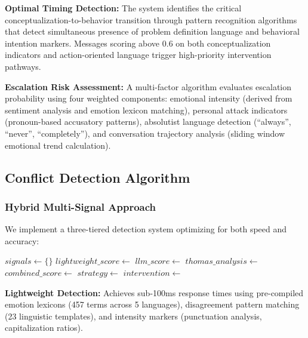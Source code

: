\documentclass[12pt,a4paper]{article}
\begin{document}
\textbf{Optimal Timing Detection:} The system identifies the critical conceptualization-to-behavior transition through pattern recognition algorithms that detect simultaneous presence of problem definition language and behavioral intention markers. Messages scoring above 0.6 on both conceptualization indicators and action-oriented language trigger high-priority intervention pathways.

\textbf{Escalation Risk Assessment:} A multi-factor algorithm evaluates escalation probability using four weighted components: emotional intensity (derived from sentiment analysis and emotion lexicon matching), personal attack indicators (pronoun-based accusatory patterns), absolutist language detection (``always'', ``never'', ``completely''), and conversation trajectory analysis (sliding window emotional trend calculation).

\subsection{Conflict Detection Algorithm}

\subsubsection{Hybrid Multi-Signal Approach}
We implement a three-tiered detection system optimizing for both speed and accuracy:

\begin{algorithmic}[1]
    \State $signals \leftarrow \{\}$
    \State $lightweight\_score \leftarrow$  
    \State $llm\_score \leftarrow$  
    \State $thomas\_analysis \leftarrow$ 
    \State $combined\_score \leftarrow$ 
        \State $strategy \leftarrow$ 
        \State $intervention \leftarrow$ 
        \Return {}
    \EndIf
\EndProcedure
\end{algorithmic}

\textbf{Lightweight Detection:} Achieves sub-100ms response times using pre-compiled emotion lexicons (457 terms across 5 languages), disagreement pattern matching (23 linguistic templates), and intensity markers (punctuation analysis, capitalization ratios).
\end{document}
